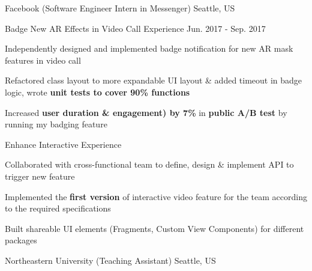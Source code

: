 

\begin{cventries}

  \cventry
    {} %
    {Facebook (Software Engineer Intern in Messenger)} %
    {Seattle, US} %
    {} %
    {}

  \vspace{-10mm}
  \cventry
    {Badge New AR Effects in Video Call Experience} %
    {}  %
    {}  %
    {Jun. 2017 - Sep. 2017} %
    {
      \begin{cvitems} %
        \item {Independently designed and implemented badge notification for new AR mask features in video call}
        \item {Refactored class layout to more expandable UI layout \& added timeout in badge logic, wrote \textbf{unit tests to cover 90\% functions}}
        \item {Increased \textbf{user duration \& engagement) by 7\%} in \textbf{public A/B test} by running my badging feature}
      \end{cvitems}
    }

  \vspace{-2mm}
  \cventry
    {Enhance Interactive Experience} %
    {}  %
    {}  %
    {} %
    {
      \begin{cvitems} %
        \item {Collaborated with cross-functional team to define, design \& implement API to trigger new feature}
        \item {Implemented the \textbf{first version} of interactive video feature for the team according to the required specifications}
        \item {Built shareable UI elements (Fragments, Custom View Components) for different packages}
      \end{cvitems}
    }

  \cventry
    {} %
    {Northeastern University (Teaching Assistant)} %
    {Seattle, US} %
    {} %
    {}


\end{cventries}
